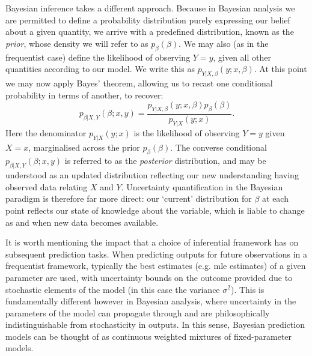 \documentclass[thesis.tex]{subfiles}
\begin{document}
Bayesian inference takes a different approach. Because in Bayesian analysis we are permitted to define a probability distribution purely expressing our belief about a given quantity, we arrive with a predefined distribution, known as the \emph{prior}, whose density we will refer to as $p_{\beta}(\beta)$. We may also (as in the frequentist case) define the likelihood of observing $Y=y$, given all other quantities according to our model. We write this as $p_{Y|X, \beta}(y; x, \beta)$. At this point we may now apply Bayes' theorem, allowing us to recast one conditional probability in terms of another, to recover:
\[p_{\beta|X,Y}(\beta; x, y) = \frac{p_{Y|X, \beta}(y; x, \beta)p_\beta(\beta)}{p_{Y|X}(y;x)}.\]
Here the denominator $p_{Y|X}(y;x)$ is the likelihood of observing $Y=y$ given $X=x$, marginalised across the prior $p_{\beta}(\beta)$. The converse conditional $p_{\beta|X,Y}(\beta; x, y)$ is referred to as the \emph{posterior} distribution, and may be understood as an updated distribution reflecting our new understanding having observed data relating $X$ and $Y$.  Uncertainty quantification in the Bayesian paradigm is therefore far more direct: our `current' distribution for $\beta$ at each point reflects our state of knowledge about the variable, which is liable to change as and when new data becomes available.

It is worth mentioning the impact that a choice of inferential framework has on subsequent prediction tasks. When predicting outputs for future observations in a frequentist framework, typically the best estimates (e.g. \gls{mle} estimates) of a given parameter are used, with uncertainty bounds on the outcome provided due to stochastic elements of the model (in this case the variance $\sigma^2$). This is fundamentally different however in Bayesian analysis, where uncertainty in the parameters of the model can propagate through and are philosophically indistinguishable from stochasticity in outputs. In this sense, Bayesian prediction models can be thought of as continuous weighted mixtures of fixed-parameter models.
\end{document}
